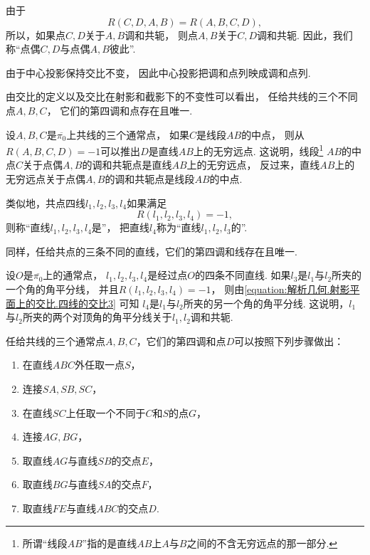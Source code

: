 由于\begin{equation*}
	R(C,D,A,B)
	= R(A,B,C,D),
\end{equation*}
所以，如果点\(C,D\)关于\(A,B\)调和共轭，
则点\(A,B\)关于\(C,D\)调和共轭.
因此，我们称“点偶\(C,D\)与点偶\(A,B\)彼此”.

由于中心投影保持交比不变，
因此中心投影把调和点列映成调和点列.

由交比的定义以及交比在射影和截影下的不变性可以看出，
任给共线的三个不同点\(A,B,C\)，
它们的第四调和点存在且唯一.

设\(A,B,C\)是\(\overline{\pi_0}\)上共线的三个通常点，
如果\(C\)是线段\(AB\)的中点，
则从\(R(A,B,C,D) = -1\)可以推出\(D\)是直线\(AB\)上的无穷远点.
这说明，线段\footnote{
	所谓“线段\(AB\)”指的是直线\(AB\)上\(A\)与\(B\)之间的不含无穷远点的那一部分.
}%
\(AB\)的中点\(C\)关于点偶\(A,B\)的调和共轭点是直线\(AB\)上的无穷远点，
反过来，直线\(AB\)上的无穷远点关于点偶\(A,B\)的调和共轭点是线段\(AB\)的中点.

类似地，共点四线\(l_1,l_2,l_3,l_4\)如果满足\begin{equation*}
	R(l_1,l_2,l_3,l_4) = -1,
\end{equation*}
则称“直线\(l_1,l_2,l_3,l_4\)是”，
把直线\(l_4\)称为“直线\(l_1,l_2,l_3\)的”.

同样，任给共点的三条不同的直线，它们的第四调和线存在且唯一.

设\(O\)是\(\overline{\pi_0}\)上的通常点，
\(l_1,l_2,l_3,l_4\)是经过点\(O\)的四条不同直线.
如果\(l_3\)是\(l_1\)与\(l_2\)所夹的一个角的角平分线，
并且\(R(l_1,l_2,l_3,l_4) = -1\)，
则由\cref{equation:解析几何.射影平面上的交比.四线的交比3} 可知
\(l_4\)是\(l_1\)与\(l_2\)所夹的另一个角的角平分线.
这说明，\(l_1\)与\(l_2\)所夹的两个对顶角的角平分线关于\(l_1,l_2\)调和共轭.

任给共线的三个通常点\(A,B,C\)，它们的第四调和点\(D\)可以按照下列步骤做出：\begin{enumerate}
	\item 在直线\(ABC\)外任取一点\(S\)，
	\item 连接\(SA,SB,SC\)，
	\item 在直线\(SC\)上任取一个不同于\(C\)和\(S\)的点\(G\)，
	\item 连接\(AG,BG\)，
	\item 取直线\(AG\)与直线\(SB\)的交点\(E\)，
	\item 取直线\(BG\)与直线\(SA\)的交点\(F\)，
	\item 取直线\(FE\)与直线\(ABC\)的交点\(D\).
\end{enumerate}


